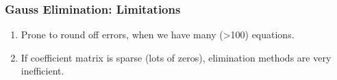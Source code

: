\documentclass[notes]{beamer}
\begin{document}
\begin{frame}
	\frametitle{Gauss Elimination: Limitations}
	\begin{enumerate}
		\item Prone to round off errors, when we have many (>100) equations.
		\item If coefficient matrix is sparse (lots of zeros), elimination methods are very inefficient.
	\end{enumerate}
\end{frame}
\end{document}
